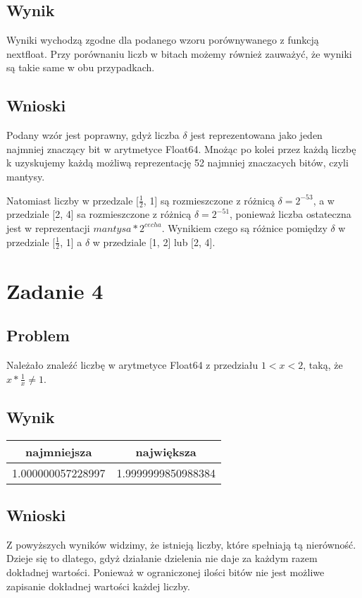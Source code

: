 \documentclass[12pt, a4paper]{article}
\begin{document}
\subsection{Wynik}
Wyniki wychodzą zgodne dla podanego wzoru porównywanego z funkcją nextfloat. Przy porównaniu liczb w bitach możemy również zauważyć, że wyniki są takie same w obu przypadkach.
\subsection{Wnioski}
Podany wzór jest poprawny, gdyż liczba $\delta$ jest reprezentowana jako jeden najmniej znaczący bit w arytmetyce Float64. Mnożąc po kolei przez każdą liczbę k uzyskujemy każdą możliwą reprezentację 52 najmniej znaczacych bitów, czyli mantysy.

Natomiast liczby w przedzale [$\frac{1}{2}$, 1] są rozmieszczone z różnicą $\delta = 2^{-53}$, a w przedziale [2, 4] sa rozmieszczone z różnicą $\delta = 2^{-51}$, ponieważ liczba ostateczna jest w reprezentacji $mantysa*2^{cecha}$. Wynikiem czego są różnice pomiędzy $\delta$ w przedziale [$\frac{1}{2}$, 1] a $\delta$ w przedziale [1, 2] lub [2, 4].
\section{Zadanie 4}
\subsection{Problem}
Należało znaleźć liczbę w arytmetyce Float64 z przedziału $1 < x < 2$, taką, że $x * \frac{1}{x} \neq 1$.
\subsection{Wynik}
\begin{center}
  \begin{tabular}{c|c}
    najmniejsza & największa\\
    \hline
    1.000000057228997 & 1.9999999850988384
  \end{tabular}
\end{center}
\subsection{Wnioski}
Z powyższych wyników widzimy, że istnieją liczby, które spełniają tą nierówność. Dzieje się to dlatego, gdyż działanie dzielenia nie daje za każdym razem dokładnej wartości. Ponieważ w ograniczonej ilości bitów nie jest możliwe zapisanie dokładnej wartości każdej liczby.
\end{document}
